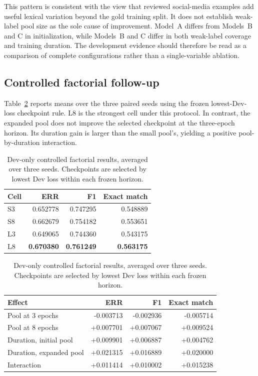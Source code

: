 \documentclass[11pt]{article}
\begin{document}
This pattern is consistent with the view that reviewed social-media examples add useful lexical variation beyond the gold training split. It does not establish weak-label pool size as the sole cause of improvement. Model~A differs from Models~B and C in initialization, while Models~B and C differ in both weak-label coverage and training duration. The development evidence should therefore be read as a comparison of complete configurations rather than a single-variable ablation.

\subsection{Controlled factorial follow-up}

Table~\ref{tab:factorial-results} reports means over the three paired seeds using the frozen lowest-Dev-loss checkpoint rule. L8 is the strongest cell under this protocol. In contrast, the expanded pool does not improve the selected checkpoint at the three-epoch horizon. Its duration gain is larger than the small pool's, yielding a positive pool-by-duration interaction.

\begin{table}[t]
\centering
\caption{Dev-only controlled factorial results, averaged over three seeds. Checkpoints are selected by lowest Dev loss within each frozen horizon.}
\label{tab:factorial-results}
\begin{tabular}{lrrr}
\toprule
Cell & ERR & F1 & Exact match \\
\midrule
S3 & 0.652778 & 0.747295 & 0.548889 \\
S8 & 0.662679 & 0.754182 & 0.553651 \\
L3 & 0.649065 & 0.744360 & 0.543175 \\
L8 & \textbf{0.670380} & \textbf{0.761249} & \textbf{0.563175} \\
\bottomrule
\end{tabular}
\qquad
\begin{tabular}{lrrr}
\toprule
Effect & ERR & F1 & Exact match \\
\midrule
Pool at 3 epochs & -0.003713 & -0.002936 & -0.005714 \\
Pool at 8 epochs & +0.007701 & +0.007067 & +0.009524 \\
Duration, initial pool & +0.009901 & +0.006887 & +0.004762 \\
Duration, expanded pool & +0.021315 & +0.016889 & +0.020000 \\
Interaction & +0.011414 & +0.010002 & +0.015238 \\
\bottomrule
\end{tabular}
\end{table}
\end{document}
